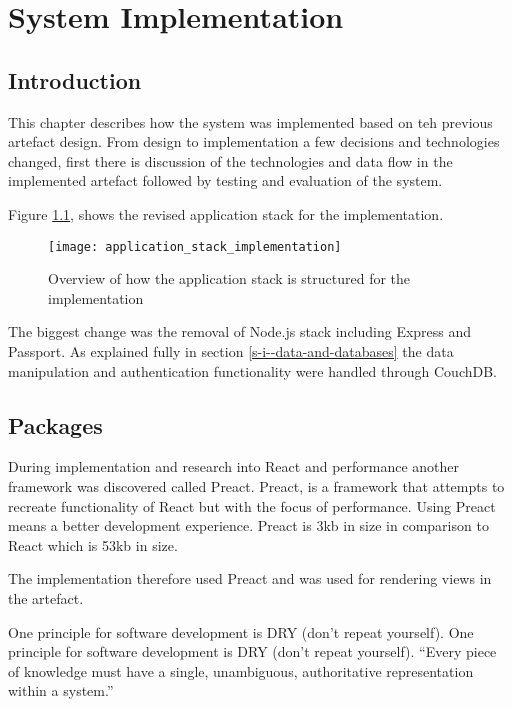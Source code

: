 \chapter{System Implementation} \label{s-i}

\section{Introduction} \label{s-i--introduction}

This chapter describes how the system was implemented based on teh previous artefact design. From design to implementation a few decisions and technologies changed, first there is discussion of the technologies and data flow in the implemented artefact followed by testing and evaluation of the system.

Figure \ref{figure-application-stack-implementation}, shows the revised application stack for the implementation.

\begin{figure}[H]
  \centering
    \texttt{[image: application\_stack\_implementation]}
  \caption{Overview of how the application stack is structured for the implementation}
  \label{figure-application-stack-implementation}
\end{figure}

The biggest change was the removal of Node.js stack including Express and Passport. As explained fully in section \ref{s-i--data-and-databases} the data manipulation and authentication functionality were handled through CouchDB.

\section{Packages} \label{s-i--packages}

During implementation and research into React and performance another framework was discovered called Preact. Preact, is a framework that attempts to recreate functionality of React but with the focus of performance. Using Preact means a better development experience. \cite{preact} Preact is 3kb in size in comparison to React which is 53kb in size.

The implementation therefore used Preact and was used for rendering views in the artefact.

One principle for software development is DRY (don't repeat yourself). One principle for software development is DRY (don't repeat yourself). ``Every piece of knowledge must have a single, unambiguous, authoritative representation within a system.'' \cite{DRY}

